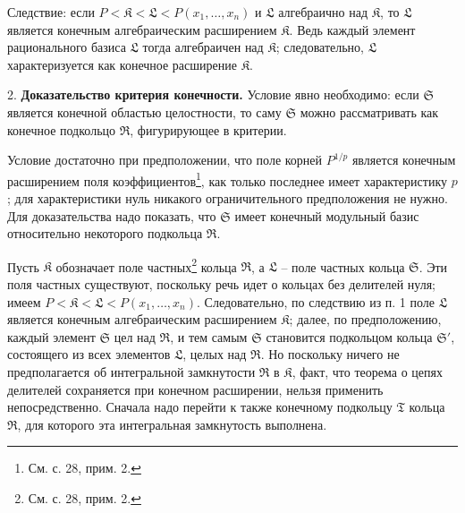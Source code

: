 \documentclass[11pt]{article}
\begin{document}
Следствие: если $P<\mathfrak K<\mathfrak L<P(x_1,\ldots,x_n)$ и $\mathfrak L$ алгебраично над $\mathfrak K$, то $\mathfrak L$ является конечным алгебраическим расширением $\mathfrak K$. Ведь каждый элемент рационального базиса $\mathfrak L$ тогда алгебраичен над $\mathfrak K$; следовательно, $\mathfrak L$ характеризуется как конечное расширение $\mathfrak K$.

2. \textbf{Доказательство критерия конечности.} Условие явно необходимо: если $\mathfrak S$ является конечной областью целостности, то саму $\mathfrak S$ можно рассматривать как конечное подкольцо $\mathfrak R$, фигурирующее в критерии.

Условие достаточно при предположении, что поле корней $P^{1/p}$ является конечным расширением поля коэффициентов\footnote{См. с. 28, прим. 2.}, как только последнее имеет характеристику $p$; для характеристики нуль никакого ограничительного предположения не нужно. Для доказательства надо показать, что $\mathfrak S$ имеет конечный модульный базис относительно некоторого подкольца $\mathfrak R$.

Пусть $\mathfrak K$ обозначает поле частных\footnote{См. с. 28, прим. 2.} кольца $\mathfrak R$, а $\mathfrak L$ -- поле частных кольца $\mathfrak S$. Эти поля частных существуют, поскольку речь идет о кольцах без делителей нуля; имеем $P<\mathfrak K<\mathfrak L<P(x_1,\ldots,x_n)$. Следовательно, по следствию из п. 1 поле $\mathfrak L$ является конечным алгебраическим расширением $\mathfrak K$; далее, по предположению, каждый элемент $\mathfrak S$ цел над $\mathfrak R$, и тем самым $\mathfrak S$ становится подкольцом кольца $\mathfrak S'$, состоящего из всех элементов $\mathfrak L$, целых над $\mathfrak R$. Но поскольку ничего не предполагается об интегральной замкнутости $\mathfrak R$ в $\mathfrak K$, факт, что теорема о цепях делителей сохраняется при конечном расширении, нельзя применить непосредственно. Сначала надо перейти к также конечному подкольцу $\mathfrak T$ кольца $\mathfrak R$, для которого эта интегральная замкнутость выполнена.
\end{document}
